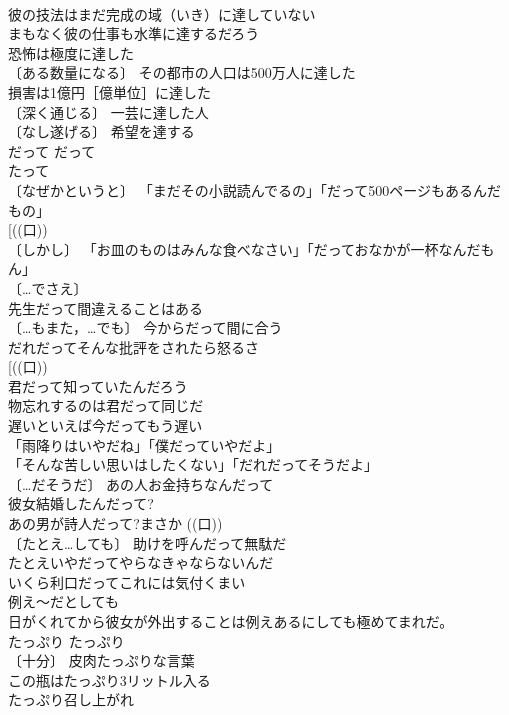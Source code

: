 \documentclass[8pt]{extreport}
\begin{document}
\begin{CJK}{UTF8}{min}
\\	彼の技法はまだ完成の域（いき）に達していない 
\\	まもなく彼の仕事も水準に達するだろう 
\\	恐怖は極度に達した 
\\	〔ある数量になる〕 その都市の人口は500万人に達した 
\\	損害は1億円［億単位］に達した 
\\	〔深く通じる〕 一芸に達した人 
\\	〔なし遂げる〕 希望を達する 
\\	だって	だって	
\\	たって 
\\	〔なぜかというと〕 「まだその小説読んでるの」「だって500ページもあるんだもの」 
\\	[((口)) 
\\	〔しかし〕 「お皿のものはみんな食べなさい」「だっておなかが一杯なんだもん」 
\\	〔…でさえ〕
\\	先生だって間違えることはある 
\\	〔…もまた，…でも〕 今からだって間に合う 
\\	だれだってそんな批評をされたら怒るさ 
\\	[((口)) 
\\	君だって知っていたんだろう 
\\	物忘れするのは君だって同じだ 
\\	遅いといえば今だってもう遅い 
\\	「雨降りはいやだね」「僕だっていやだよ」 
\\	「そんな苦しい思いはしたくない」「だれだってそうだよ」 
\\	〔…だそうだ〕 あの人お金持ちなんだって 
\\	彼女結婚したんだって? 
\\	あの男が詩人だって?まさか ((口)) 
\\	〔たとえ…しても〕 助けを呼んだって無駄だ 
\\	たとえいやだってやらなきゃならないんだ 
\\	いくら利口だってこれには気付くまい 
\\	例え～だとしても 
\\	日がくれてから彼女が外出することは例えあるにしても極めてまれだ。 
\\	たっぷり	たっぷり	
\\	〔十分〕 皮肉たっぷりな言葉 
\\	この瓶はたっぷり3リットル入る 
\\	たっぷり召し上がれ 

\end{CJK}
\end{document}
